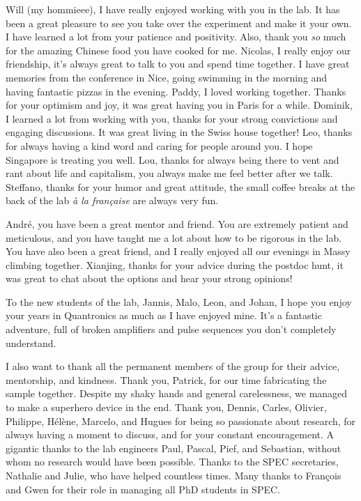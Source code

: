 Will (my hommieee), I have really enjoyed working with you in the lab. It has been a great pleasure to see you take over the experiment and make it your own. I have learned a lot from your patience and positivity. Also, thank you \textit{so} much for the amazing Chinese food you have cooked for me. Nicolas, I really enjoy our friendship, it's always great to talk to you and spend time together. I have great memories from the conference in Nice, going swimming in the morning and having fantastic pizzas in the evening. Paddy, I loved working together. Thanks for your optimism and joy, it was great having you in Paris for a while. Dominik, I learned a lot from working with you, thanks for your strong convictions and engaging discussions. It was great living in the Swiss house together! Leo, thanks for always having a kind word and caring for people around you. I hope Singapore is treating you well. Lou, thanks for always being there to vent and rant about life and capitalism, you always make me feel better after we talk. Steffano, thanks for your humor and great attitude, the small coffee breaks at the back of the lab \textit{à la française} are always very fun.

André, you have been a great mentor and friend. You are extremely patient and meticulous, and you have taught me a lot about how to be rigorous in the lab. You have also been a great friend, and I really enjoyed all our evenings in Massy climbing together. Xianjing, thanks for your advice during the postdoc hunt, it was great to chat about the options and hear your strong opinions!

To the new students of the lab, Jannis, Malo, Leon, and Johan, I hope you enjoy your years in Quantronics as much as I have enjoyed mine. It's a fantastic adventure, full of broken amplifiers and pulse sequences you don't completely understand.

I also want to thank all the permanent members of the group for their advice, mentorship, and kindness. Thank you, Patrick, for our time fabricating the sample together. Despite my shaky hands and general carelessness, we managed to make a superhero device in the end. Thank you, Dennis, Carles, Olivier, Philippe, Hélène, Marcelo, and Hugues for being so passionate about research, for always having a moment to discuss, and for your constant encouragement. A gigantic thanks to the lab engineers Paul, Pascal, Pief, and Sebastian, without whom no research would have been possible. Thanks to the SPEC secretaries, Nathalie and Julie, who have helped countless times. Many thanks to François and Gwen for their role in managing all PhD students in SPEC.

